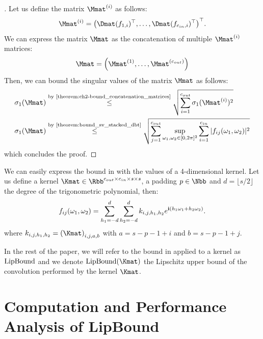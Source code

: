 \begin{proof}[]
  Let us define the matrix $\Mmat^{(i)}$ as follows:
\begin{equation}
  \Mmat^{(i)} = \leftmat \Dmat(f_{1, i})^\top, \dots, \Dmat(f_{\cin, i})^\top \rightmat^\top .
\end{equation}
We can express the matrix $\Mmat$ as the concatenation of multiple $\Mmat^{(i)}$ matrices:
\begin{equation}
  \Mmat = \leftmat \Mmat^{(1)}, \dots, \Mmat^{(\cout)} \rightmat
\end{equation}
Then, we can bound the singular values of the matrix $\Mmat$ as follows:
\begin{align}
  \sigma_1\left(\Mmat\right) &\stackrel{\text{by \Cref{theorem:ch2-bound_concatenation_matrices}}}{\leq} \sqrt{\sum_{i=1}^{\cout} \sigma_1(\Mmat^{(i)})^2} \\
  \sigma_1\left(\Mmat\right) &\stackrel{\text{by \Cref{theorem:bound_sv_stacked_dbt}}}{\leq} \sqrt{\sum_{j=1}^{\cout} \sup_{\omega_1, \omega_2 \in [0, 2\pi]^2} \sum_{i=1}^{\cin} |f_{ij}(\omega_1, \omega_2)|^2 }
\end{align}
which concludes the proof. 
\end{proof}

\endgroup
\pagebreak

We can easily express the bound in  with the values of a 4-dimensional kernel.
Let us define a kernel $\Kmat \in \Rbb^{\cout \times \cin \times s \times s}$, a padding $p \in \Nbb$ and $d = \lfloor s / 2 \rfloor$ the degree of the trigonometric polynomial, then:
\begin{equation}
  f_{ij}(\omega_1, \omega_2) = \sum_{h_1 = -d}^d \sum_{h_2 = -d}^d k_{i, j, h_1,h_2} e^{\mathbf{i} (h_1 \omega_1 + h_2 \omega_2)}.
\end{equation}
where $k_{i, j, h_1,h_2} = \leftmat \Kmat \rightmat_{i, j, a, b}$ with $a =  s - p - 1 + i$ and $b =  s - p - 1 + j$.

In the rest of the paper, we will refer to the bound in  applied to a kernel as $\mathrm{LipBound}$ and we denote $\lipbound(\Kmat)$ the Lipschitz upper bound of the convolution performed by the kernel $\Kmat$. 


\section{Computation and Performance Analysis of LipBound}
\label{section:ch5-computation_and_performance_analysis_of_lipbound}

